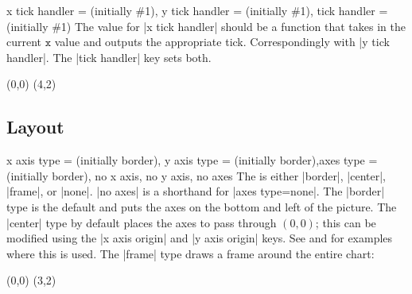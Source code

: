 \begin{sseqdata}[name = basic, cohomological Serre grading]
\begin{keylist}{x tick handler =  (initially \#1), y tick handler =  (initially \#1), tick handler =  (initially \#1)}
The value for |x tick handler| should be a function that takes in the current $\mathtt{x}$ value and outputs the appropriate tick. Correspondingly with |y tick handler|. The |tick handler| key sets both.
\begin{codeexample}[width = 7cm]
\begin{sseqpage}[ x range = {0}{4}, yscale = 1.78,
    x tick handler = {
        \ifnum#1 = 0\relax
            0
        \else
            \ifnum#1 = 1\relax
                \protect\vphantom{2}n
            \else
                #1n
            \fi
        \fi
    }
]
\class(0,0)
\class(4,2)
\end{sseqpage}
\end{codeexample}
\end{keylist}

\subsection{Layout}
\begin{keylist}{x axis type =  (initially border), y axis type =  (initially border),axes type =  (initially border), no x axis, no y axis, no axes}
The  is either |border|, |center|, |frame|, or |none|. |no axes| is a shorthand for |axes type=none|. The |border| type is the default and puts the axes on the bottom and left of the picture. The |center| type by default places the axes to pass through $(0,0)$; this can be modified using the |x axis origin| and |y axis origin| keys. See  and  for examples where this is used. The |frame| type draws a frame around the entire chart:

\begin{codeexample}[width=6cm]
\begin{sseqpage}[axes type=frame]
\class(0,0)
\class(3,2)
\end{sseqpage}
\end{codeexample}
\end{keylist}


\end{sseqdata}
